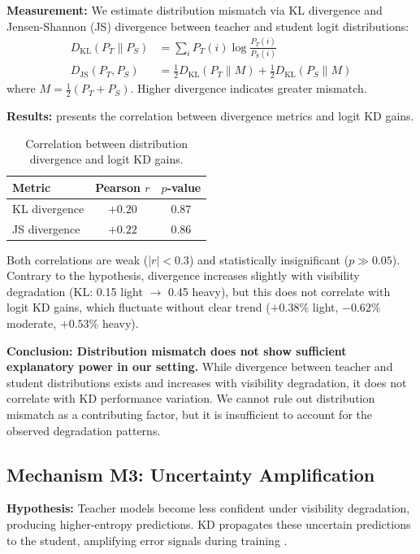 \textbf{Measurement:} We estimate distribution mismatch via KL divergence and Jensen-Shannon (JS) divergence between teacher and student logit distributions:
\begin{align}
D_{\text{KL}}(P_T \| P_S) &= \sum_i P_T(i) \log \frac{P_T(i)}{P_S(i)} \\
D_{\text{JS}}(P_T, P_S) &= \frac{1}{2} D_{\text{KL}}(P_T \| M) + \frac{1}{2} D_{\text{KL}}(P_S \| M)
\end{align}
where $M = \frac{1}{2}(P_T + P_S)$. Higher divergence indicates greater mismatch.

\textbf{Results:}  presents the correlation between divergence metrics and logit KD gains.

\begin{table}[htbp]
\centering
\caption{Correlation between distribution divergence and logit KD gains.}
\label{tab:divergence_corr}
\begin{tabular}{@{}lcc@{}}
\toprule
Metric & Pearson $r$ & $p$-value \\
\midrule
KL divergence & $+0.20$ & $0.87$ \\
JS divergence & $+0.22$ & $0.86$ \\
\bottomrule
\end{tabular}
\end{table}

Both correlations are weak ($|r| < 0.3$) and statistically insignificant ($p \gg 0.05$). Contrary to the hypothesis, divergence increases slightly with visibility degradation (KL: 0.15 light $\to$ 0.45 heavy), but this does not correlate with logit KD gains, which fluctuate without clear trend ($+0.38\%$ light, $-0.62\%$ moderate, $+0.53\%$ heavy).

\textbf{Conclusion: Distribution mismatch does not show sufficient explanatory power in our setting.} While divergence between teacher and student distributions exists and increases with visibility degradation, it does not correlate with KD performance variation. We cannot rule out distribution mismatch as a contributing factor, but it is insufficient to account for the observed degradation patterns.

\subsection{Mechanism M3: Uncertainty Amplification}

\textbf{Hypothesis:} Teacher models become less confident under visibility degradation, producing higher-entropy predictions. KD propagates these uncertain predictions to the student, amplifying error signals during training \cite{kendall2017uncertainties}.

